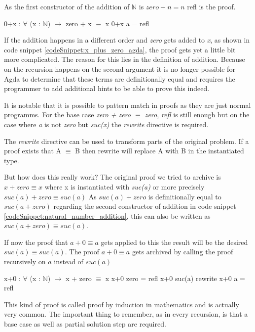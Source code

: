 As the first constructor of the addition of $\mathbb{N}$ is $zero + n = n$ refl is the proof.

\begin{codesnippet}[mathescape=true, caption={Proof of addition to zero in Agda}, label={codeSnippet:zero_plus_x_agda}]
0+x : $\forall$ (x : $\mathbb{N}$) $\rightarrow$ zero + x $\equiv$ x
0+x a = refl
\end{codesnippet}

If the addition happens in a different order and \emph{zero} gets added to \emph{x}, as shown in code snippet \ref{codeSnippet:x_plus_zero_agda}, the proof gets yet a little bit more complicated. 
The reason for this lies in the definition of addition.
Because on the recursion happens on the second argument it is no longer possible for Agda to determine that these terms are definitionally equal and requires the programmer to add additional hints to be able to prove this indeed.

It is notable that it is possible to pattern match in proofs as they are just normal programms. 
For the base case \emph{zero + zero $\equiv$ zero}, \emph{refl} is still enough but on the case where \emph{a} is not \emph{zero} but \emph{suc(x)} the \emph{rewrite} directive is required.

The \emph{rewrite} directive can be used to transform parts of the original problem. If a proof exists that A $\equiv$ B then rewrite will replace A with B in the instantiated type.

But how does this really work?
The original proof we tried to archive is $x + zero \equiv x$ where x is instantiated with \emph{suc(a)} or more precisely $suc(a) + zero \equiv suc(a)$
As $suc(a) + zero$ is definitionally equal to $suc(a + zero)$ regarding the second constructor of addition in code snippet \ref{codeSnippet:natural_number_addition}, this can also be written as $suc(a + zero) \equiv suc(a)$.

If now the proof that $a + 0 \equiv a$ gets applied to this the result will be the desired $suc(a) \equiv suc(a)$. The proof $a + 0 \equiv a$ gets archived by calling the proof recursively on $a$ instead of $suc(a)$

\begin{codesnippet}[mathescape=true, caption={Proof of addition to zero in Agda}, label={codeSnippet:x_plus_zero_agda}]
x+0 : $\forall$ (x : $\mathbb{N}$) $\rightarrow$ x + zero $\equiv$ x
x+0 zero = refl
x+0 suc(a) rewrite x+0 a = refl
\end{codesnippet}

This kind of proof is called proof by induction in mathematics and is actually very common.
The important thing to remember, as in every recursion, is that a base case as well as partial solution step are required.
